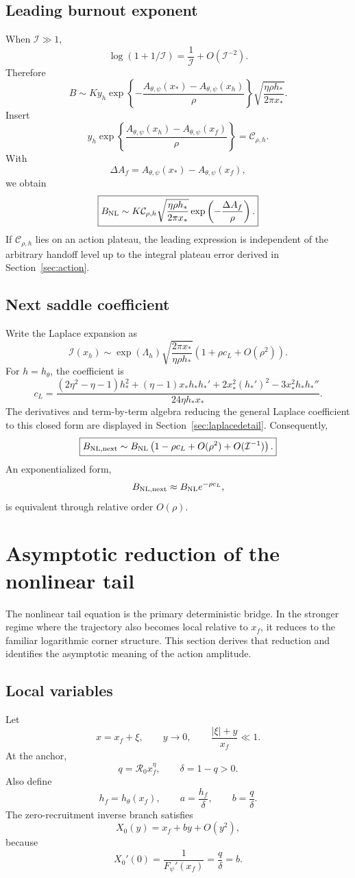 \documentclass[11pt]{article}
\newcommand{\Rzero}{\mathcal R_0}
\newcommand{\hth}{h_\theta}
\newcommand{\Fpsi}{F_\psi}
\newcommand{\Apsi}{A_{\theta,\psi}}
\newcommand{\xf}{x_f}
\newcommand{\xs}{x_*}
\begin{document}
\subsection{Leading burnout exponent}
When $\mathcal I\gg1$,
\[
\log(1+1/\mathcal I)
=\frac1{\mathcal I}+O(\mathcal I^{-2}).
\]
Therefore
\[
B
\sim
Ky_h
\exp\left\{-\frac{\Apsi(\xs)-\Apsi(x_h)}\rho\right\}
\sqrt{\frac{\eta\rho h_*}{2\pi\xs}}.
\]
Insert
\[
y_h
\exp\left\{\frac{\Apsi(x_h)-\Apsi(\xf)}\rho\right\}
=\mathcal C_{\rho,h}.
\]
With
\[
\Delta A_f=\Apsi(\xs)-\Apsi(\xf),
\]
we obtain
\[
\boxed{
B_{\rm NL}
\sim
K\mathcal C_{\rho,h}
\sqrt{\frac{\eta\rho h_*}{2\pi\xs}}
\exp\left(-\frac{\Delta A_f}{\rho}\right).
}
\]
If $\mathcal C_{\rho,h}$ lies on an action plateau, the leading expression is independent of the arbitrary handoff level up to the integral plateau error derived in Section~\ref{sec:action}.

\subsection{Next saddle coefficient}
Write the Laplace expansion as
\[
\mathcal I(x_h)
\sim
\exp(\Lambda_h)
\sqrt{\frac{2\pi\xs}{\eta\rho h_*}}
\left(1+\rho c_L+O(\rho^2)\right).
\]
For $h=h_\theta$, the coefficient is
\[
\boxed{
 c_L=
\frac{
(2\eta^2-\eta-1)h_*^2
+(\eta-1)\xs h_*h_*'
+2\xs^2(h_*')^2
-3\xs^2h_*h_*''
}
{24\eta h_*\xs}.
}
\]
The derivatives and term-by-term algebra reducing the general Laplace coefficient to this closed form are displayed in Section~\ref{sec:laplacedetail}.
Consequently,
\[
\boxed{
B_{\rm NL,next}
\sim
B_{\rm NL}\left(1-\rho c_L+O(\rho^2)+O(\mathcal I^{-1})\right).
}
\]
An exponentialized form,
\[
B_{\rm NL,next}
\approx B_{\rm NL}e^{-\rho c_L},
\]
is equivalent through relative order $O(\rho)$.

\section{Asymptotic reduction of the nonlinear tail}
\label{sec:reduction}

The nonlinear tail equation is the primary deterministic bridge. In the stronger regime where the trajectory also becomes local relative to $\xf$, it reduces to the familiar logarithmic corner structure. This section derives that reduction and identifies the asymptotic meaning of the action amplitude.

\subsection{Local variables}
Let
\[
x=\xf+\xi,
\qquad
y\to0,
\qquad
\frac{|\xi|+y}{\xf}\ll1.
\]
At the anchor,
\[
q=\Rzero\xf^\eta,
\qquad
\delta=1-q>0.
\]
Also define
\[
h_f=\hth(\xf),
\qquad
\boxed{a=\frac{h_f}{\delta}},
\qquad
\boxed{b=\frac q\delta}.
\]
The zero-recruitment inverse branch satisfies
\[
X_0(y)=\xf+by+O(y^2),
\]
because
\[
X_0'(0)=\frac1{\Fpsi'(\xf)}=\frac q\delta=b.
\]
\end{document}
